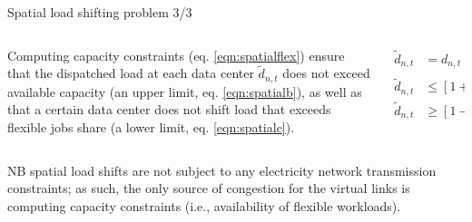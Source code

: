 \begin{frame}{Spatial load shifting problem 3/3}

  {\footnotesize
  \begin{columns}

    \begin{column}{6cm}
      Computing capacity constraints (eq. \ref{eqn:spatialflex}) ensure that the dispatched load at each data center  $\widetilde{d}_{n,t}$ does not exceed available capacity (an upper limit, eq. \ref{eqn:spatialb}), as well as that a certain data center does not shift load that exceeds flexible jobs share (a lower limit, eq. \ref{eqn:spatialc}).
    \end{column}

  \begin{column}{7cm}
    \begin{subequations}
      \begin{align}
          \widetilde{d}_{n,t} &=  d_{n,t} + \sum_{\vartheta \in \Theta_n^{rec}}\delta_{\vartheta, t} - \sum_{\vartheta \in \Theta_n^{snd}}\delta_{\vartheta, t} \quad \forall n \in N_{DC}, t \in T \label{eqn:spatiala} \\
          \widetilde{d}_{n,t} &\le [1+f] \cdot d_{n,t}  \quad \forall n \in N_{DC}, t \in T \label{eqn:spatialb} \\
          \widetilde{d}_{n,t} &\ge [1-f] \cdot d_{n,t}  \quad \forall n \in N_{DC}, t \in T \label{eqn:spatialc}
      \end{align}
      \label{eqn:spatialflex}
      \end{subequations}
  \end{column}
  \end{columns}

  \vspace{-0.1cm}
  NB spatial load shifts are not subject to any electricity network transmission constraints; as such, the only source of congestion for the virtual links is computing capacity constraints (i.e., availability of flexible workloads). \\

}
\end{frame}
